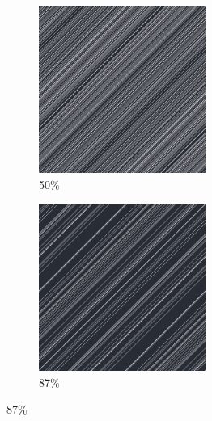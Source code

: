 \documentclass[12pt, fleqn]{report}                             %
\theoremstyle{break}                                            %
\begin{document}
\begin{figure}[ht!]
\begin{subfigure}[b]{0.4\linewidth}
          \includegraphics[width=0.6\textwidth]{Images/10/c.png}
          \caption{50\%}
        \end{subfigure}
        \begin{subfigure}[b]{0.4\linewidth}
          \includegraphics[width=0.6\textwidth]{Images/10/d.png}
          \caption{87\%}
        \end{subfigure}
      \end{figure}
\end{document}
